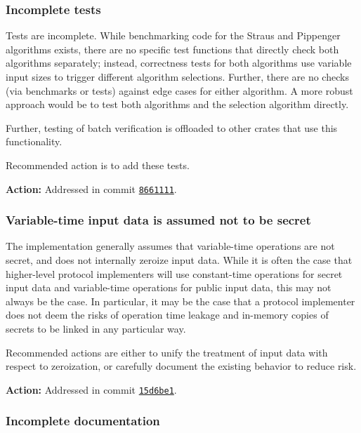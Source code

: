 \documentclass{article}
\begin{document}
\subsubsection{Incomplete tests}

Tests are incomplete.
While benchmarking code for the Straus and Pippenger algorithms exists, there are no specific test functions that directly check both algorithms separately; instead, correctness tests for both algorithms use variable input sizes to trigger different algorithm selections.
Further, there are no checks (via benchmarks or tests) against edge cases for either algorithm.
A more robust approach would be to test both algorithms and the selection algorithm directly.

Further, testing of batch verification is offloaded to other crates that use this functionality.

Recommended action is to add these tests.

\textbf{Action:} Addressed in commit \href{https://github.com/serai-dex/serai/commit/8661111fc6b9228e15276a566994a9fa7a6e39f6}{\texttt{8661111}}.


\subsubsection{Variable-time input data is assumed not to be secret}

The implementation generally assumes that variable-time operations are not secret, and does not internally zeroize input data.
While it is often the case that higher-level protocol implementers will use constant-time operations for secret input data and variable-time operations for public input data, this may not always be the case.
In particular, it may be the case that a protocol implementer does not deem the risks of operation time leakage and in-memory copies of secrets to be linked in any particular way.

Recommended actions are either to unify the treatment of input data with respect to zeroization, or carefully document the existing behavior to reduce risk.

\textbf{Action:} Addressed in commit \href{https://github.com/serai-dex/serai/commit/15d6be16783064a3e94780e1fd79861534c6aef8}{\texttt{15d6be1}}.


\subsubsection{Incomplete documentation}
\end{document}
